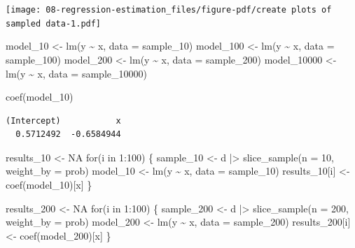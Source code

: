 \documentclass[
  letterpaper,
  DIV=11,
  numbers=noendperiod]{scrreprt}
\newenvironment{Shaded}{\begin{snugshade}}{\end{snugshade}}
\newcommand{\AttributeTok}[1]{\textcolor[rgb]{0.40,0.45,0.13}{#1}}
\newcommand{\ConstantTok}[1]{\textcolor[rgb]{0.56,0.35,0.01}{#1}}
\newcommand{\ControlFlowTok}[1]{\textcolor[rgb]{0.00,0.23,0.31}{#1}}
\newcommand{\DecValTok}[1]{\textcolor[rgb]{0.68,0.00,0.00}{#1}}
\newcommand{\FunctionTok}[1]{\textcolor[rgb]{0.28,0.35,0.67}{#1}}
\newcommand{\NormalTok}[1]{\textcolor[rgb]{0.00,0.23,0.31}{#1}}
\newcommand{\OtherTok}[1]{\textcolor[rgb]{0.00,0.23,0.31}{#1}}
\newcommand{\SpecialCharTok}[1]{\textcolor[rgb]{0.37,0.37,0.37}{#1}}
\newcommand{\StringTok}[1]{\textcolor[rgb]{0.13,0.47,0.30}{#1}}
\begin{document}
\texttt{[image: 08-regression-estimation\_files/figure-pdf/create plots of sampled data-1.pdf]}

\begin{Shaded}
\begin{Highlighting}[]
\NormalTok{model\_10    }\OtherTok{\textless{}{-}} \FunctionTok{lm}\NormalTok{(y }\SpecialCharTok{\textasciitilde{}}\NormalTok{ x, }\AttributeTok{data =}\NormalTok{ sample\_10)}
\NormalTok{model\_100   }\OtherTok{\textless{}{-}} \FunctionTok{lm}\NormalTok{(y }\SpecialCharTok{\textasciitilde{}}\NormalTok{ x, }\AttributeTok{data =}\NormalTok{ sample\_100)}
\NormalTok{model\_200   }\OtherTok{\textless{}{-}} \FunctionTok{lm}\NormalTok{(y }\SpecialCharTok{\textasciitilde{}}\NormalTok{ x, }\AttributeTok{data =}\NormalTok{ sample\_200)}
\NormalTok{model\_10000 }\OtherTok{\textless{}{-}} \FunctionTok{lm}\NormalTok{(y }\SpecialCharTok{\textasciitilde{}}\NormalTok{ x, }\AttributeTok{data =}\NormalTok{ sample\_10000)}

\FunctionTok{coef}\NormalTok{(model\_10)}
\end{Highlighting}
\end{Shaded}

\begin{verbatim}
(Intercept)           x 
  0.5712492  -0.6584944 
\end{verbatim}

\begin{Shaded}
\begin{Highlighting}[]
\NormalTok{results\_10 }\OtherTok{\textless{}{-}} \ConstantTok{NA} 
\ControlFlowTok{for}\NormalTok{(i }\ControlFlowTok{in} \DecValTok{1}\SpecialCharTok{:}\DecValTok{100}\NormalTok{) \{ }
\NormalTok{  sample\_10  }\OtherTok{\textless{}{-}}\NormalTok{ d }\SpecialCharTok{|\textgreater{}} \FunctionTok{slice\_sample}\NormalTok{(}\AttributeTok{n =} \DecValTok{10}\NormalTok{, }\AttributeTok{weight\_by =}\NormalTok{ prob)}
\NormalTok{  model\_10   }\OtherTok{\textless{}{-}} \FunctionTok{lm}\NormalTok{(y }\SpecialCharTok{\textasciitilde{}}\NormalTok{ x, }\AttributeTok{data =}\NormalTok{ sample\_10)}
\NormalTok{  results\_10[i] }\OtherTok{\textless{}{-}} \FunctionTok{coef}\NormalTok{(model\_10)[}\StringTok{\textquotesingle{}x\textquotesingle{}}\NormalTok{]}
\NormalTok{\}}

\NormalTok{results\_200 }\OtherTok{\textless{}{-}} \ConstantTok{NA} 
\ControlFlowTok{for}\NormalTok{(i }\ControlFlowTok{in} \DecValTok{1}\SpecialCharTok{:}\DecValTok{100}\NormalTok{) \{ }
\NormalTok{  sample\_200  }\OtherTok{\textless{}{-}}\NormalTok{ d }\SpecialCharTok{|\textgreater{}} \FunctionTok{slice\_sample}\NormalTok{(}\AttributeTok{n =} \DecValTok{200}\NormalTok{, }\AttributeTok{weight\_by =}\NormalTok{ prob)}
\NormalTok{  model\_200   }\OtherTok{\textless{}{-}} \FunctionTok{lm}\NormalTok{(y }\SpecialCharTok{\textasciitilde{}}\NormalTok{ x, }\AttributeTok{data =}\NormalTok{ sample\_200)}
\NormalTok{  results\_200[i] }\OtherTok{\textless{}{-}} \FunctionTok{coef}\NormalTok{(model\_200)[}\StringTok{\textquotesingle{}x\textquotesingle{}}\NormalTok{]}
\NormalTok{  \}}
\end{Highlighting}
\end{Shaded}
\end{document}
